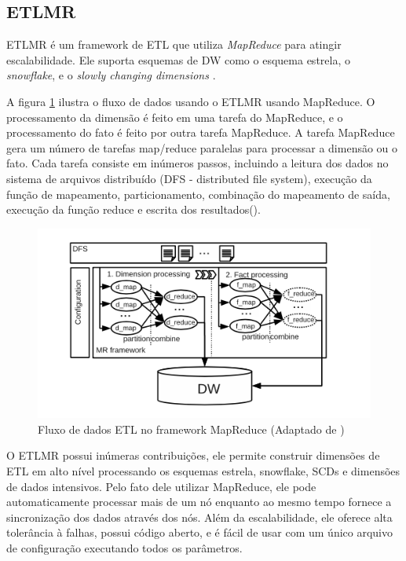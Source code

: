 \subsection{ETLMR}

ETLMR é um framework de ETL que utiliza \textit{MapReduce} para atingir escalabilidade. Ele suporta esquemas de DW como o esquema estrela, o \textit{snowflake}, e o \textit{slowly changing dimensions} \cite{liu:2011}. 

A figura \ref{etlmr} ilustra o fluxo de dados usando o ETLMR usando MapReduce. O processamento da dimensão é feito em uma tarefa do MapReduce, e o processamento do fato é feito por outra tarefa MapReduce. A tarefa MapReduce gera um número de tarefas map/reduce paralelas para processar a dimensão ou o fato. Cada tarefa consiste em inúmeros passos, incluindo a leitura dos dados no sistema de arquivos distribuído (DFS - distributed file system), execução da função de mapeamento, particionamento, combinação do mapeamento de saída, execução da função reduce e escrita dos resultados(\cite{liu:2011}).

\begin{figure}
	\centering
	\includegraphics[scale=0.9]{fig/etlmr.png}
	\caption{Fluxo de dados ETL no framework MapReduce (Adaptado de \cite{liu:2011})}
	\label{etlmr}
\end{figure}

O ETLMR possui inúmeras contribuições, ele permite construir dimensões de ETL em alto nível processando os esquemas estrela, snowflake, SCDs e dimensões de dados intensivos. Pelo fato dele utilizar MapReduce, ele pode automaticamente processar mais de um nó enquanto ao mesmo tempo fornece a sincronização dos dados através dos nós. Além da escalabilidade, ele oferece alta tolerância à falhas, possui código aberto, e é fácil de usar com um único arquivo de configuração executando todos os parâmetros.

